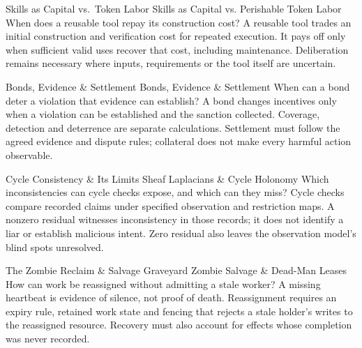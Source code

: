 \expandafter\def\csname pdlandmarktitle@09\endcsname{Skills as Capital vs.\ Token Labor}
\expandafter\def\csname pdlandmarkconcept@09\endcsname{Skills as Capital vs. Perishable Token Labor}
\expandafter\def\csname pdlandmarkquestion@09\endcsname{When does a reusable tool repay its construction cost?}
\expandafter\def\csname pdlandmarkquote@09\endcsname{A reusable tool trades an initial construction and verification cost for repeated execution. It pays off only when sufficient valid uses recover that cost, including maintenance. Deliberation remains necessary where inputs, requirements or the tool itself are uncertain.}

\expandafter\def\csname pdlandmarktitle@10\endcsname{Bonds, Evidence \& Settlement}
\expandafter\def\csname pdlandmarkconcept@10\endcsname{Bonds, Evidence \& Settlement}
\expandafter\def\csname pdlandmarkquestion@10\endcsname{When can a bond deter a violation that evidence can establish?}
\expandafter\def\csname pdlandmarkquote@10\endcsname{A bond changes incentives only when a violation can be established and the sanction collected. Coverage, detection and deterrence are separate calculations. Settlement must follow the agreed evidence and dispute rules; collateral does not make every harmful action observable.}

\expandafter\def\csname pdlandmarktitle@11\endcsname{Cycle Consistency \& Its Limits}
\expandafter\def\csname pdlandmarkconcept@11\endcsname{Sheaf Laplacians \& Cycle Holonomy}
\expandafter\def\csname pdlandmarkquestion@11\endcsname{Which inconsistencies can cycle checks expose, and which can they miss?}
\expandafter\def\csname pdlandmarkquote@11\endcsname{Cycle checks compare recorded claims under specified observation and restriction maps. A nonzero residual witnesses inconsistency in those records; it does not identify a liar or establish malicious intent. Zero residual also leaves the observation model's blind spots unresolved.}

\expandafter\def\csname pdlandmarktitle@12\endcsname{The Zombie Reclaim \& Salvage Graveyard}
\expandafter\def\csname pdlandmarkconcept@12\endcsname{Zombie Salvage \& Dead-Man Leases}
\expandafter\def\csname pdlandmarkquestion@12\endcsname{How can work be reassigned without admitting a stale worker?}
\expandafter\def\csname pdlandmarkquote@12\endcsname{A missing heartbeat is evidence of silence, not proof of death. Reassignment requires an expiry rule, retained work state and fencing that rejects a stale holder's writes to the reassigned resource. Recovery must also account for effects whose completion was never recorded.}

